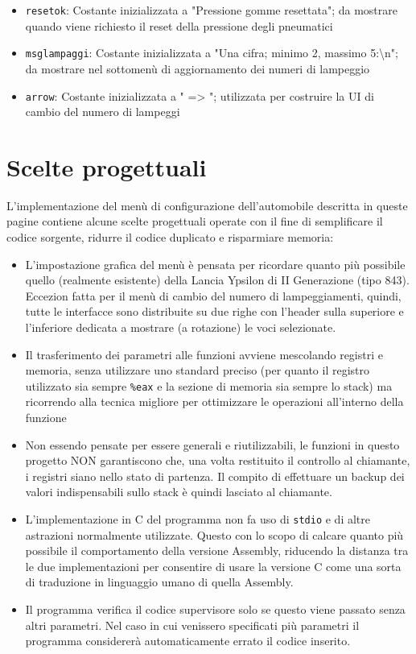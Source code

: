 \documentclass[
  12pt,
  a4paper,
  headings=optiontoheadandtoc
]{scrreprt}
\begin{document}
\begin{itemize}
\begin{itemize}
    \item \texttt{resetok}: Costante inizializzata a "Pressione gomme resettata"; da mostrare quando viene richiesto il reset della pressione degli pneumatici
    \item \texttt{msglampaggi}: Costante inizializzata a "Una cifra; minimo 2, massimo 5:\textbackslash{}n"; da mostrare nel sottomenù di aggiornamento dei numeri di lampeggio
    \item \texttt{arrow}: Costante inizializzata a " =\textgreater{} "; utilizzata per costruire la UI di cambio del numero di lampeggi
  \end{itemize}
\end{itemize}

\chapter[nonumber=true]{Scelte progettuali}

L'implementazione del menù di configurazione dell'automobile descritta in queste pagine contiene alcune scelte progettuali operate con il fine di semplificare il codice sorgente, ridurre il codice duplicato e risparmiare memoria:

\begin{itemize}
\item L'impostazione grafica del menù è pensata per ricordare quanto più possibile quello (realmente esistente) della Lancia Ypsilon di II Generazione (tipo 843). Eccezion fatta per il menù di cambio del numero di lampeggiamenti, quindi, tutte le interfacce sono distribuite su due righe con l'header sulla superiore e l'inferiore dedicata a mostrare (a rotazione) le voci selezionate.
\item Il trasferimento dei parametri alle funzioni avviene mescolando registri e memoria, senza utilizzare uno standard preciso (per quanto il registro utilizzato sia sempre \texttt{\%eax} e la sezione di memoria sia sempre lo stack) ma ricorrendo alla tecnica migliore per ottimizzare le operazioni all'interno della funzione
\item Non essendo pensate per essere generali e riutilizzabili, le funzioni in questo progetto NON garantiscono che, una volta restituito il controllo al chiamante, i registri siano nello stato di partenza. Il compito di effettuare un backup dei valori indispensabili sullo stack è quindi lasciato al chiamante.
\item L'implementazione in C del programma non fa uso di \texttt{stdio} e di altre astrazioni normalmente utilizzate. Questo con lo scopo di calcare quanto più possibile il comportamento della versione Assembly, riducendo la distanza tra le due implementazioni per consentire di usare la versione C come una sorta di traduzione in linguaggio umano di quella Assembly.
\item Il programma verifica il codice supervisore solo se questo viene passato senza altri parametri. Nel caso in cui venissero specificati più parametri il programma considererà automaticamente errato il codice inserito.
\end{itemize}
\end{document}
